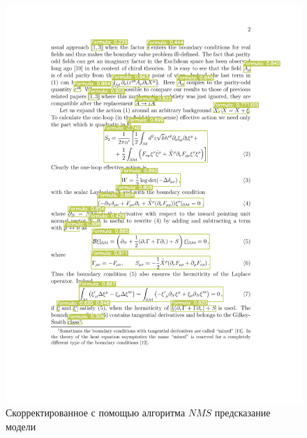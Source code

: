 \begin{figure}
    \includegraphics[scale=0.75]{img/train/nms.png}
    \caption{Скорректированное с помощью алгоритма $NMS$ предсказание модели}
    \label{nms_img}
\end{figure}